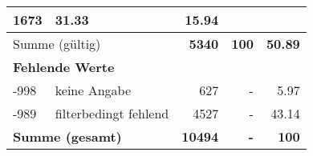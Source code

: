 \begin{longtable}{lXrrr}
       \num{1673} &
       \num[round-mode=places,round-precision=2]{31.33} &
         \num[round-mode=places,round-precision=2]{15.94} \\
     \midrule
     \multicolumn{2}{l}{Summe (gültig)} &
       \textbf{\num{5340}} &
     \textbf{\num{100}} &
       \textbf{\num[round-mode=places,round-precision=2]{50.89}} \\
     \multicolumn{5}{l}{\textbf{Fehlende Werte}}\\
       -998 &
       keine Angabe &
         \num{627} &
        - &
         \num[round-mode=places,round-precision=2]{5.97} \\
       -989 &
       filterbedingt fehlend &
         \num{4527} &
        - &
         \num[round-mode=places,round-precision=2]{43.14} \\
     \midrule
     \multicolumn{2}{l}{\textbf{Summe (gesamt)}} &
          \textbf{\num{10494}} &
        \textbf{-} &
        \textbf{\num{100}} \\
     \bottomrule
     \end{longtable}
     
